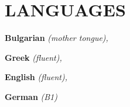 \documentclass[paper=letter,fontsize=11pt]{scrartcl} %
\newcommand{\sepspace}{\vspace*{1em}}		%
\newcommand{\NewPart}[2]{\section*{\uppercase{#1} \small \normalfont #2}}
\newcommand{\WorkEntry}[5]{
		\noindent \textbf{#1}
        \noindent \small \textit{#2}
        \hfill      %
        \colorbox{White}{%
			\parbox{6em}{%
			\hfill\color{Black}#3}} \par  %
		\noindent \textit{#4} \par        %
		\noindent\hangindent=2em\hangafter=0 \small #5 %
		\normalsize \par}
\newcommand{\Language}[2]{
		\noindent \textbf{#1}
        \noindent \small \textit{#2}}
\begin{document}

\NewPart{LANGUAGES}{}

\Language{Bulgarian}{(mother tongue),}
\Language{Greek}{ (fluent),}
\Language{English}{(fluent),}
\Language{German}{(B1)}
\end{document}
